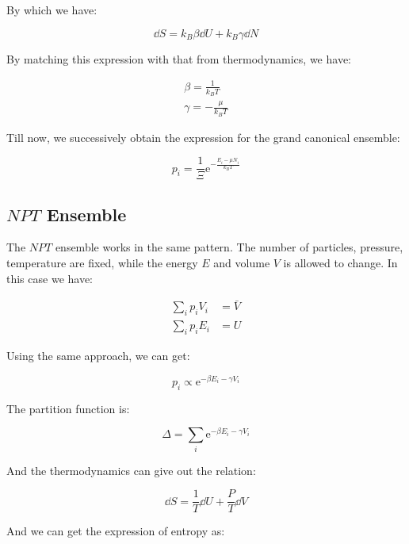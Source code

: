 \documentclass[../main.tex]{subfiles}
\begin{document}
By which we have:

\begin{equation}
    \dd{S} = k_B \beta \dd{U} + k_B\gamma \dd{N}
\end{equation}

By matching this expression with that from thermodynamics, we have:

\begin{align}
    \beta = \frac{1}{k_B T}\\
    \gamma = - \frac{\mu}{k_B T}
\end{align}

Till now, we successively obtain the expression for the grand canonical ensemble:

\begin{equation}
    p_i = \frac{1}{\Xi} \textrm{e}^{-\frac{E_i - \mu N_i}{k_B T}}
\end{equation}

\subsection{$NPT$ Ensemble}

The $NPT$ ensemble works in the same pattern. The number of particles, pressure, temperature are fixed, while the energy $E$ and volume $V$ is allowed to change. In this case we have:

\begin{align}
    \sum_{i} p_i V_i &= \bar{V}\\
    \sum_{i} p_i E_i &= U
\end{align}

Using the same approach, we can get:

\begin{equation}
    p_i \propto \textrm{e}^{-\beta E_i - \gamma V_i}
\end{equation}

The partition function is:

\begin{equation}
    \Delta = \sum_{i} \textrm{e}^{-\beta E_i - \gamma V_i}
\end{equation}

And the thermodynamics can give out the relation:

\begin{equation}
    \dd{S} = \frac{1}{T}\dd{U} + \frac{P}{T}\dd{V}
\end{equation}

And we can get the expression of entropy as:
\end{document}

